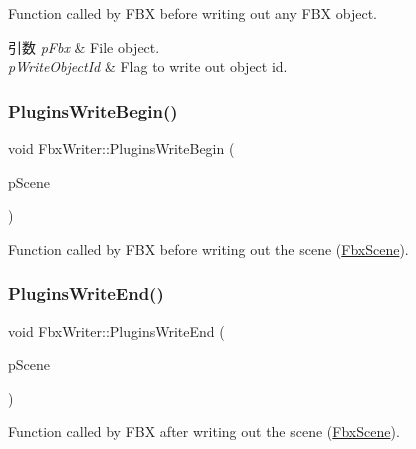 Function called by F\+BX before writing out any F\+BX object. 
\begin{DoxyParams}{引数}
{\em p\+Fbx} & File object. \\
\hline
{\em p\+Write\+Object\+Id} & Flag to write out object id. \\
\hline
\end{DoxyParams}
\mbox{\label{class_fbx_writer_a33b44e856c07510bddf658fd446789d1}} 
\subsubsection{\texorpdfstring{Plugins\+Write\+Begin()}{PluginsWriteBegin()}}
{\footnotesize\ttfamily void Fbx\+Writer\+::\+Plugins\+Write\+Begin (\begin{DoxyParamCaption}\item[{\hyperlink{class_fbx_scene}{Fbx\+Scene} \&}]{p\+Scene }\end{DoxyParamCaption})\hspace{0.3cm}{\ttfamily [protected]}}



Function called by F\+BX before writing out the scene (\hyperlink{class_fbx_scene}{Fbx\+Scene}). 

\mbox{\label{class_fbx_writer_a85e89b71d39755ef0a426aa7b35221d6}} 
\subsubsection{\texorpdfstring{Plugins\+Write\+End()}{PluginsWriteEnd()}}
{\footnotesize\ttfamily void Fbx\+Writer\+::\+Plugins\+Write\+End (\begin{DoxyParamCaption}\item[{\hyperlink{class_fbx_scene}{Fbx\+Scene} \&}]{p\+Scene }\end{DoxyParamCaption})\hspace{0.3cm}{\ttfamily [protected]}}



Function called by F\+BX after writing out the scene (\hyperlink{class_fbx_scene}{Fbx\+Scene}). 

